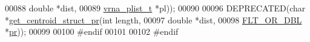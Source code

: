 \begin{DoxyCode}
00088                               \textcolor{keywordtype}{double} *dist,
00089                               \hyperlink{group__data__structures_structvrna__plist__s}{vrna\_plist\_t} *pl));
00090 
00096 DEPRECATED(\textcolor{keywordtype}{char}  *\hyperlink{centroid_8h_ac92486ce514677256f4a832dc518759c}{get\_centroid\_struct\_pr}(\textcolor{keywordtype}{int} length,
00097                               \textcolor{keywordtype}{double} *dist,
00098                               \hyperlink{group__data__structures_ga31125aeace516926bf7f251f759b6126}{FLT\_OR\_DBL} *\hyperlink{fold__vars_8h_ac98ec419070aee6831b44e5c700f090f}{pr}));
00099 
00100 \textcolor{preprocessor}{#endif}
00101 
00102 \textcolor{preprocessor}{#endif}
\end{DoxyCode}
